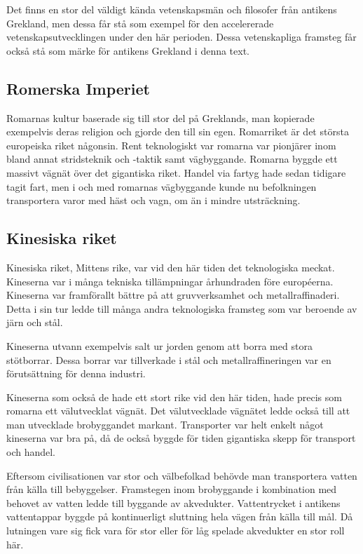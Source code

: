 \documentclass[a4paper,12pt,fleqn]{article}
\begin{document}
Det finns en stor del väldigt kända vetenskapsmän och filosofer från antikens Grekland, men dessa får stå som exempel för den accelererade vetenskapsutvecklingen under den här perioden. Dessa vetenskapliga framsteg får också stå som märke för antikens Grekland i denna text. 

\subsection{Romerska Imperiet}

Romarnas kultur baserade sig till stor del på Greklands, man kopierade exempelvis deras religion och gjorde den till sin egen. Romarriket är det största europeiska riket någonsin. Rent teknologiskt var romarna var pionjärer inom bland annat stridsteknik och -taktik samt vägbyggande. Romarna byggde ett massivt vägnät över det gigantiska riket. Handel via fartyg hade sedan tidigare tagit fart, men i och med romarnas vägbyggande kunde nu befolkningen transportera varor med häst och vagn, om än i mindre utsträckning. 

\subsection{Kinesiska riket}

Kinesiska riket, Mittens rike, var vid den här tiden det teknologiska meckat. Kineserna var i många tekniska tillämpningar århundraden före européerna. Kineserna var framförallt bättre på att gruvverksamhet och metallraffinaderi. Detta i sin tur ledde till många andra teknologiska framsteg som var beroende av järn och stål. 

Kineserna utvann exempelvis salt ur jorden genom att borra med stora stötborrar. Dessa borrar var tillverkade i stål och metallraffineringen var en förutsättning för denna industri. 

Kineserna som också de hade ett stort rike vid den här tiden, hade precis som romarna ett välutvecklat vägnät. Det välutvecklade vägnätet ledde också till att man utvecklade brobyggandet markant. Transporter var helt enkelt något kineserna var bra på, då de också byggde för tiden gigantiska skepp för transport och handel. 

Eftersom civilisationen var stor och välbefolkad behövde man transportera vatten från källa till bebyggelser. Framstegen inom brobyggande i kombination med behovet av vatten ledde till byggande av akvedukter. Vattentrycket i antikens vattentappar byggde på kontinuerligt sluttning hela vägen från källa till mål. Då lutningen vare sig fick vara för stor eller för låg spelade akvedukter en stor roll här. 
\end{document}
